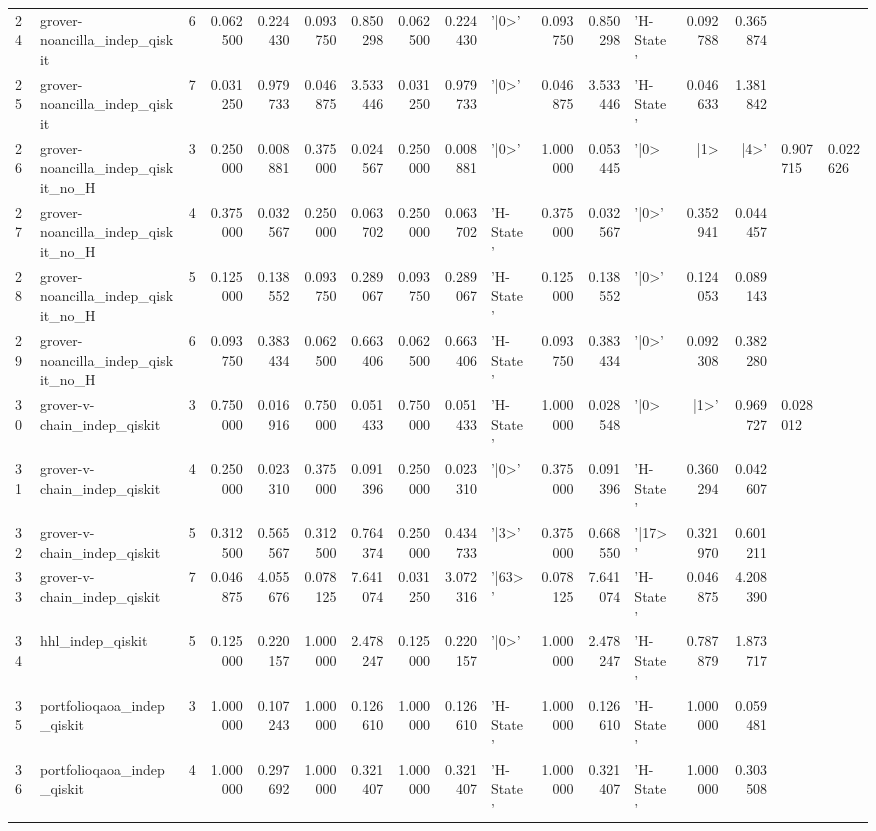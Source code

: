 \begin{table}
\begin{tabular}{llrrrrrrrlrrlrr}
24 & grover-noancilla_indep_qiskit & 6 & 0.062500 & 0.224430 & 0.093750 & 0.850298 & 0.062500 & 0.224430 & '|0>' & 0.093750 & 0.850298 & 'H-State' & 0.092788 & 0.365874 \\
25 & grover-noancilla_indep_qiskit & 7 & 0.031250 & 0.979733 & 0.046875 & 3.533446 & 0.031250 & 0.979733 & '|0>' & 0.046875 & 3.533446 & 'H-State' & 0.046633 & 1.381842 \\
26 & grover-noancilla_indep_qiskit_no_H & 3 & 0.250000 & 0.008881 & 0.375000 & 0.024567 & 0.250000 & 0.008881 & '|0>' & 1.000000 & 0.053445 & '|0> & |1> & |4>' & 0.907715 & 0.022626 \\
27 & grover-noancilla_indep_qiskit_no_H & 4 & 0.375000 & 0.032567 & 0.250000 & 0.063702 & 0.250000 & 0.063702 & 'H-State' & 0.375000 & 0.032567 & '|0>' & 0.352941 & 0.044457 \\
28 & grover-noancilla_indep_qiskit_no_H & 5 & 0.125000 & 0.138552 & 0.093750 & 0.289067 & 0.093750 & 0.289067 & 'H-State' & 0.125000 & 0.138552 & '|0>' & 0.124053 & 0.089143 \\
29 & grover-noancilla_indep_qiskit_no_H & 6 & 0.093750 & 0.383434 & 0.062500 & 0.663406 & 0.062500 & 0.663406 & 'H-State' & 0.093750 & 0.383434 & '|0>' & 0.092308 & 0.382280 \\
30 & grover-v-chain_indep_qiskit & 3 & 0.750000 & 0.016916 & 0.750000 & 0.051433 & 0.750000 & 0.051433 & 'H-State' & 1.000000 & 0.028548 & '|0> & |1>' & 0.969727 & 0.028012 \\
31 & grover-v-chain_indep_qiskit & 4 & 0.250000 & 0.023310 & 0.375000 & 0.091396 & 0.250000 & 0.023310 & '|0>' & 0.375000 & 0.091396 & 'H-State' & 0.360294 & 0.042607 \\
32 & grover-v-chain_indep_qiskit & 5 & 0.312500 & 0.565567 & 0.312500 & 0.764374 & 0.250000 & 0.434733 & '|3>' & 0.375000 & 0.668550 & '|17>' & 0.321970 & 0.601211 \\
33 & grover-v-chain_indep_qiskit & 7 & 0.046875 & 4.055676 & 0.078125 & 7.641074 & 0.031250 & 3.072316 & '|63>' & 0.078125 & 7.641074 & 'H-State' & 0.046875 & 4.208390 \\
34 & hhl_indep_qiskit & 5 & 0.125000 & 0.220157 & 1.000000 & 2.478247 & 0.125000 & 0.220157 & '|0>' & 1.000000 & 2.478247 & 'H-State' & 0.787879 & 1.873717 \\
35 & portfolioqaoa_indep_qiskit & 3 & 1.000000 & 0.107243 & 1.000000 & 0.126610 & 1.000000 & 0.126610 & 'H-State' & 1.000000 & 0.126610 & 'H-State' & 1.000000 & 0.059481 \\
36 & portfolioqaoa_indep_qiskit & 4 & 1.000000 & 0.297692 & 1.000000 & 0.321407 & 1.000000 & 0.321407 & 'H-State' & 1.000000 & 0.321407 & 'H-State' & 1.000000 & 0.303508 \\

\end{tabular}
\end{table}
